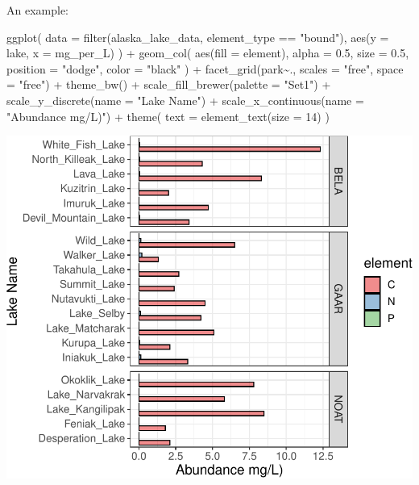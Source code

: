 \documentclass[
]{krantz}
\newenvironment{Shaded}{\begin{snugshade}}{\end{snugshade}}
\newcommand{\AttributeTok}[1]{\textcolor[rgb]{0.77,0.63,0.00}{#1}}
\newcommand{\DecValTok}[1]{\textcolor[rgb]{0.00,0.00,0.81}{#1}}
\newcommand{\FloatTok}[1]{\textcolor[rgb]{0.00,0.00,0.81}{#1}}
\newcommand{\FunctionTok}[1]{\textcolor[rgb]{0.00,0.00,0.00}{#1}}
\newcommand{\NormalTok}[1]{#1}
\newcommand{\SpecialCharTok}[1]{\textcolor[rgb]{0.00,0.00,0.00}{#1}}
\newcommand{\StringTok}[1]{\textcolor[rgb]{0.31,0.60,0.02}{#1}}
\begin{document}
An example:

\begin{Shaded}
\begin{Highlighting}[]
\FunctionTok{ggplot}\NormalTok{(}
  \AttributeTok{data =} \FunctionTok{filter}\NormalTok{(alaska\_lake\_data, element\_type }\SpecialCharTok{==} \StringTok{"bound"}\NormalTok{),}
  \FunctionTok{aes}\NormalTok{(}\AttributeTok{y =}\NormalTok{ lake, }\AttributeTok{x =}\NormalTok{ mg\_per\_L)}
\NormalTok{) }\SpecialCharTok{+}
  \FunctionTok{geom\_col}\NormalTok{(}
    \FunctionTok{aes}\NormalTok{(}\AttributeTok{fill =}\NormalTok{ element),}
    \AttributeTok{alpha =} \FloatTok{0.5}\NormalTok{, }\AttributeTok{size =} \FloatTok{0.5}\NormalTok{, }\AttributeTok{position =} \StringTok{"dodge"}\NormalTok{,}
    \AttributeTok{color =} \StringTok{"black"}
\NormalTok{  ) }\SpecialCharTok{+}
  \FunctionTok{facet\_grid}\NormalTok{(park}\SpecialCharTok{\textasciitilde{}}\NormalTok{., }\AttributeTok{scales =} \StringTok{"free"}\NormalTok{, }\AttributeTok{space =} \StringTok{"free"}\NormalTok{) }\SpecialCharTok{+}
  \FunctionTok{theme\_bw}\NormalTok{() }\SpecialCharTok{+}
  \FunctionTok{scale\_fill\_brewer}\NormalTok{(}\AttributeTok{palette =} \StringTok{"Set1"}\NormalTok{) }\SpecialCharTok{+}
  \FunctionTok{scale\_y\_discrete}\NormalTok{(}\AttributeTok{name =} \StringTok{"Lake Name"}\NormalTok{) }\SpecialCharTok{+}
  \FunctionTok{scale\_x\_continuous}\NormalTok{(}\AttributeTok{name =} \StringTok{"Abundance mg/L)"}\NormalTok{) }\SpecialCharTok{+}
  \FunctionTok{theme}\NormalTok{(}
    \AttributeTok{text =} \FunctionTok{element\_text}\NormalTok{(}\AttributeTok{size =} \DecValTok{14}\NormalTok{)}
\NormalTok{  )}
\end{Highlighting}
\end{Shaded}

\begin{center}\includegraphics{index_files/figure-latex/unnamed-chunk-175-1} \end{center}
\end{document}
